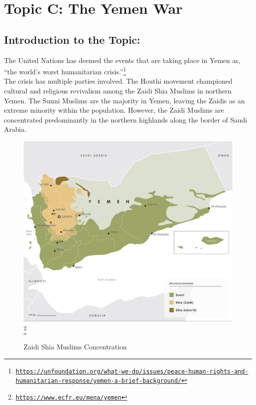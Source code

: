 \documentclass[10pt, letterpaper]{article}
\begin{document}
\newpage
\section{Topic C: The Yemen War}

\subsection{Introduction to the Topic:}

The United Nations has deemed the events that are taking place in Yemen
as, ``the world's worst humanitarian crisis.''\footnote{\texttt{\href{https://unfoundation.org/what-we-do/issues/peace-human-rights-and-humanitarian-response/yemen-a-brief-background/}{{https://unfoundation.org/what-we-do/issues/peace-human-rights-and-humanitarian-response/yemen-a-brief-background/}}}} \\

The crisis has multiple parties involved. The Houthi movement championed
cultural and religious revivalism among the Zaidi Shia Muslims in
northern Yemen. The Sunni Muslims are the majority in Yemen, leaving the
Zaidis as an extreme minority within the population. However, the Zaidi
Muslims are concentrated predominantly in the northern highlands along
the border of Saudi Arabia. \\
\begin{figure}
\centering\includegraphics[scale = 0.1]{image1.jpg}\texttt{\footnote{\href{https://www.ecfr.eu/mena/yemen}{{https://www.ecfr.eu/mena/yemen}}}} \\
\caption{Zaidi Shia Muslims Concentration}
\end{figure}
\end{document}
